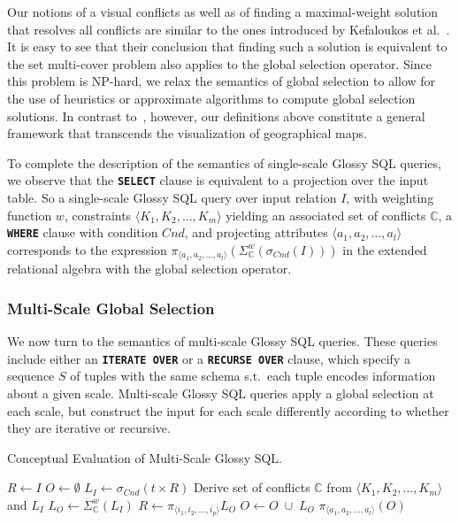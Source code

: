 \documentclass[11pt, oneside]{report}
\begin{document}
{Our notions of a visual conflicts as well as of finding a maximal-weight solution that resolves all conflicts are similar to the ones introduced by Kefaloukos et al.~\cite{KefaloukosSZ14:CVL}. It is easy to see that their conclusion that finding such a solution is equivalent to the set multi-cover problem also applies to the global selection operator. Since this problem is NP-hard, we relax the semantics of global selection to allow for the use of heuristics or approximate algorithms to compute global selection solutions. In contrast to~\cite{KefaloukosSZ14:CVL}, however, our definitions above constitute a general framework that transcends the visualization of geographical maps.     

To complete the description of the semantics of single-scale Glossy SQL queries, we observe that the \textbf{\texttt{SELECT}} clause is equivalent to a projection over the input table. So a single-scale Glossy SQL query over input relation $I$, with weighting function $w$, constraints $\langle K_1, K_2, \ldots, K_m\rangle$ yielding an associated set of conflicts $\mathbb{C}$, a \textbf{\texttt{WHERE}} clause with condition $Cnd$, and projecting attributes $\langle a_1, a_2, \ldots, a_l \rangle$ corresponds to the expression $\pi_{\langle a_1, a_2, \ldots, a_l \rangle} (\Sigma_{\mathbb{C}}^{w}(\sigma_{Cnd}(I)))$ in the extended relational algebra with the global selection operator. 
 
\subsubsection{Multi-Scale Global Selection}
\label{sec:semantics:multiscale}

We now turn to the semantics of multi-scale Glossy SQL queries. These queries include either an \textbf{\texttt{ITERATE OVER}} or a \textbf{\texttt{RECURSE OVER}} clause, which specify a sequence $S$ of tuples with the same schema s.t.~each tuple encodes information about a given scale. Multi-scale Glossy SQL queries apply a global selection at each scale, but construct the input for each scale differently according to whether they are iterative or recursive.

\begin{algorithm}
\caption{Conceptual Evaluation of Multi-Scale Glossy SQL.}
\begin{algorithmic}
\STATE $R \leftarrow I$
\STATE $O \leftarrow \emptyset$
\STATE $L_I \leftarrow \sigma_{Cnd}(t \times R)$
\STATE Derive set of conflicts $\mathbb{C}$ from $\langle K_1, K_2, \ldots, K_m\rangle$ and $L_I$
\STATE $L_O \leftarrow \Sigma_{\mathbb{C}}^{w}(L_I)$ 
\STATE $R \leftarrow \pi_{\langle i_1, i_2, \ldots, i_p \rangle} L_O$ 
\ENDIF
\STATE $O \leftarrow O \; \cup \; L_O$
\ENDFOR
\RETURN $\pi_{\langle a_1, a_2, \ldots, a_l \rangle} (O)$
\end{algorithmic}
\label{alg:conceptual:multiscale}
\end{algorithm}

}
\end{document}
